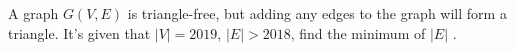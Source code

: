 A graph $G(V,E)$ is triangle-free, but adding any edges to the graph will form a triangle. It's given that $|V|=2019$, $|E|>2018$, find the minimum of $|E|$ .